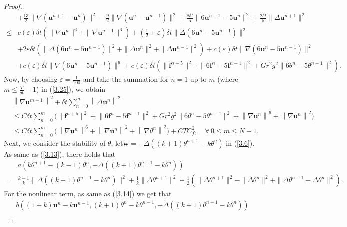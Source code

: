 \documentclass[10pt,a4paper]{amsart}
\theoremstyle{thmm}
\begin{document}
\begin{proof}
\begin{align}
			&   + \frac{13}{2} \|\nabla(\bm{u}^{n+1} - \bm{u}^n)\|^2 - \frac{9}{2} \|\nabla(\bm{u}^n - \bm{u}^{n-1})\|^2 +\frac{8\delta t}{5}\|6\bm{u}^{n+1}-5\bm{u}^n\|^2+\frac{2\delta t}{5}\|\Delta\bm{u}^{n+1}\|^2\nonumber\\
			\leq & c(\varepsilon)\delta t(\|\nabla\bm{u}^n\|^6+\|\nabla\bm{u}^{n-1}\|^6)+(\frac{1}{2}+\varepsilon)\delta t\|\Delta(6\bm{u}^{n}-5\bm{u}^{n-1})\|^2\nonumber\\
			&  +2\varepsilon\delta t(\|\Delta(6\bm{u}^{n}-5\bm{u}^{n-1})\|^2+\|\Delta\bm{u}^n\|^2+\|\Delta\bm{u}^{n-1}\|^2)+c(\varepsilon) \delta t{ \|\nabla(6\bm{u}^n-5\bm{u}^{n-1})\|^2}\nonumber\\
			&  +c(\varepsilon) \delta t\|\nabla(6\bm{u}^n-5\bm{u}^{n-1})\|^6+c(\varepsilon)\delta t(\|\bm{f}^{n+5}\|^2+\|6\bm{f}^n-5\bm{f}^{n-1}\|^2+Gr^2g^2\|6\theta^n-5\theta^{n-1}\|^2).
		\end{align}
		Now, by choosing \( \varepsilon = \frac{1}{100} \) and take the summation for $n=1$ up to $m$ (where $m\leq\frac{T}{\delta t}-1$) in (\ref{3.25}), we obtain
		{ 
		\begin{align}\label{3.26}
			&\left\| \nabla \bm{u}^{m+1} \right\|^2 + \delta t \sum_{n=0}^m \left\| \Delta \bm{u}^n \right\|^2\nonumber\\
			&\leq C \delta t \sum_{n=0}^{m} \Big( \|\bm{f}^{n+5}\|^2 + \big\|6\bm{f}^n - 5\bm{f}^{n-1}\big\|^2 + Gr^2 g^2 \big\|6\theta^n - 5\theta^{n-1}\big\|^2+\left\| \nabla \bm{u}^n \right\|^6 +\left\| \nabla \bm{u}^n \right\|^2\Big) \nonumber \\
			&\leq C \delta t \sum_{n=0}^{m} \Big(\left\| \nabla \bm{u}^n \right\|^6+\left\| \nabla \bm{u}^n \right\|^2 +\left\| \nabla \theta^n \right\|^2\Big)
			+ C T C_f^2, \quad \forall\, 0 \le m \leq N-1.
		\end{align}
		}
		Next, we consider the stability of $\theta$, let$\bm{w}=-\Delta((k+1)\theta^{n+1}-k\theta^n)$ in (\ref{3.6}). As same as  (\ref{3.13}), there holds that
		\begin{align}\label{3.27}
			& a(k\theta^{n+1}-(k-1)\theta^n,-\Delta((k+1)\theta^{n+1}-k\theta^n))\\
			= &\frac{k-1}{k}\|\Delta((k+1)\theta^{n+1}-k\theta^n)\|^2+\frac{1}{k}\|\Delta\theta^{n+1}\|^2+\frac{1}{2}(\|\Delta\theta^{n+1}\|^2-\|\Delta\theta^n\|^2+\|\Delta\theta^{n+1}-\Delta\theta^n\|^2).\nonumber
		\end{align}
		For the nonlinear term, as same as  (\ref{3.14}) we get that
		{ 
		\begin{align}\label{3.28}
			&b((1+k)\bm{u}^n-k\bm{u}^{n-1},(k+1)\theta^{n} - k\theta^{n-1},-\Delta((k+1)\theta^{n+1}-k\theta^n))\nonumber\\

\end{align}}
\end{proof}
\end{document}
